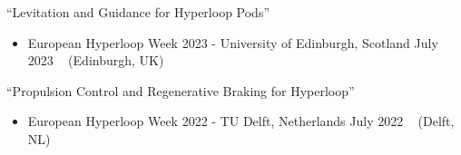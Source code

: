 \vspace{-7mm}
\begin{talks}

\talk
{``Levitation and Guidance for Hyperloop Pods''}
{
  \begin{itemize}[leftmargin=.4in]
    \item European Hyperloop Week  2023 - University of Edinburgh, Scotland \hfill July 2023 ~ (Edinburgh, UK)
  \end{itemize}
}
\vspace{-3mm}
\talk
{``Propulsion Control and Regenerative Braking  for Hyperloop''}
{
  \begin{itemize}[leftmargin=.4in]
    \item European Hyperloop Week 2022 - TU Delft, Netherlands \hfill July 2022 ~ (Delft, NL)
  \end{itemize}
}
     
\end{talks}    
\vspace{-2mm}

